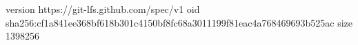 version https://git-lfs.github.com/spec/v1
oid sha256:cf1a841ee368bf618b301c4150bf8fc68a3011199f81eac4a768469693b525ac
size 1398256
